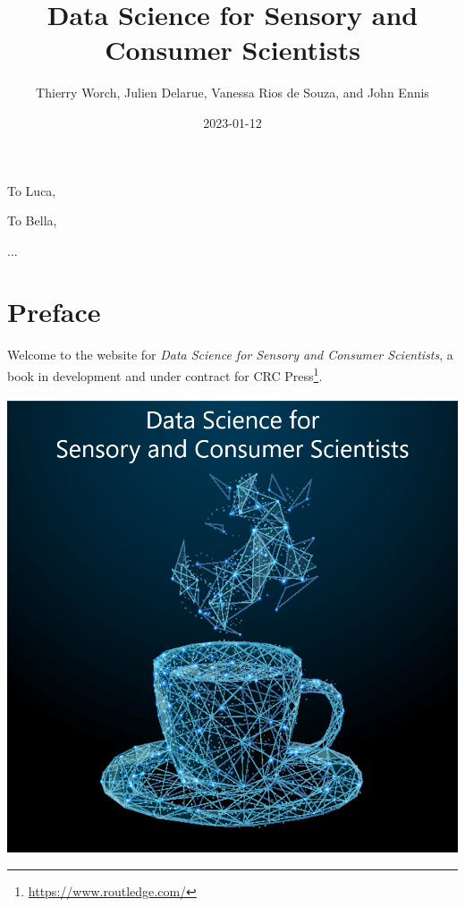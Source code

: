 \documentclass[
]{krantz}
\title{Data Science for Sensory and Consumer Scientists}
\author{Thierry Worch, Julien Delarue, Vanessa Rios de Souza, and John Ennis}
\date{2023-01-12}
\renewcommand{\href}[2]{#2\footnote{\url{#1}}}
\begin{document}
\maketitle


\thispagestyle{empty}

\begin{center}
To Luca,

To Bella,

...
\end{center}

\setlength{\abovedisplayskip}{-5pt}
\setlength{\abovedisplayshortskip}{-5pt}

{
\hypersetup{linkcolor=}
\setcounter{tocdepth}{2}
\tableofcontents
}
\hypertarget{preface}{%
\chapter*{Preface}\label{preface}}


Welcome to the website for \emph{Data Science for Sensory and Consumer Scientists}, a book in development and under contract for \href{https://www.routledge.com/}{CRC Press}.

\includegraphics[width=0.9\linewidth]{images/cover_art}
\end{document}
